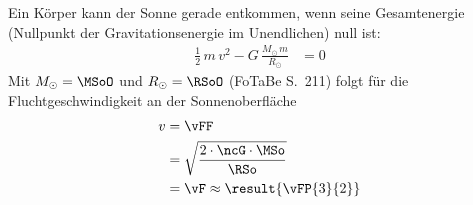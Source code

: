 Ein Körper kann der Sonne gerade entkommen, wenn seine Gesamtenergie (Nullpunkt der Gravitationsenergie im Unendlichen) null ist:
\begin{align}
 \frac{1}{2}\,m\,v^2-G\,\frac{M_\odot\,m}{R_\odot} &= 0
\end{align}
Mit $M_\odot = \MSoO$ und $R_\odot = \RSoO$ (FoTaBe S.~211) folgt für die Fluchtgeschwindigkeit an der Sonnenoberfläche
\begin{align}
 v &= \vFF \\
   &= \sqrt{\frac{2\cdot\ncG\cdot\MSo}{\RSo}} \\
   &= \vF \approx \result{\vFP{3}{2}}
\end{align}
